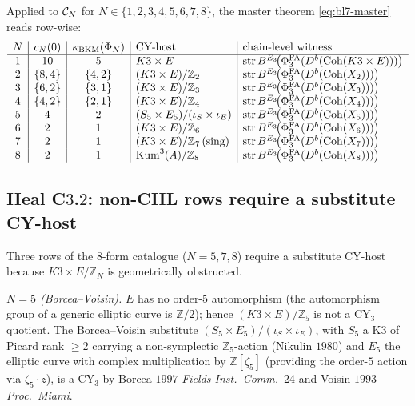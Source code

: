 Applied to $\mathcal{C}_N$ for $N \in \{1, 2, 3, 4, 5, 6, 7, 8\}$, the master
theorem \eqref{eq:bl7-master} reads row-wise:
\[
\begin{array}{c|c|c|l|l}
 N & c_N(0) & \kBKM(\Phi_N) & \text{CY-host} & \text{chain-level witness} \\ \hline
 1 & 10 & 5 & K3 \times E & \mathrm{str}\,\BE{3}\!\bigl(\PhiFAt(D^b(\Coh(K3 \times E)))\bigr) \\
 2 & \{8, 4\} & \{4, 2\} & (K3 \times E) / \mathbb{Z}_2 & \mathrm{str}\,\BE{3}\!\bigl(\PhiFAt(D^b(\Coh(X_2)))\bigr) \\
 3 & \{6, 2\} & \{3, 1\} & (K3 \times E) / \mathbb{Z}_3 & \mathrm{str}\,\BE{3}\!\bigl(\PhiFAt(D^b(\Coh(X_3)))\bigr) \\
 4 & \{4, 2\} & \{2, 1\} & (K3 \times E) / \mathbb{Z}_4 & \mathrm{str}\,\BE{3}\!\bigl(\PhiFAt(D^b(\Coh(X_4)))\bigr) \\
 5 & 4 & 2 & (S_5 \times E_5) / (\iota_S \times \iota_E) & \mathrm{str}\,\BE{3}\!\bigl(\PhiFAt(D^b(\Coh(X_5)))\bigr) \\
 6 & 2 & 1 & (K3 \times E) / \mathbb{Z}_6 & \mathrm{str}\,\BE{3}\!\bigl(\PhiFAt(D^b(\Coh(X_6)))\bigr) \\
 7 & 2 & 1 & (K3 \times E) / \mathbb{Z}_7 \,(\text{sing}) & \mathrm{str}\,\BE{3}\!\bigl(\PhiFAt(D^b(\Coh(X_7)))\bigr) \\
 8 & 2 & 1 & \mathrm{Kum}^3(A) / \mathbb{Z}_8 & \mathrm{str}\,\BE{3}\!\bigl(\PhiFAt(D^b(\Coh(X_8)))\bigr) \\
\end{array}
\]

\subsection*{Heal C$3$.$2$: non-CHL rows require a substitute
CY-host}

Three rows of the 8-form catalogue ($N = 5, 7, 8$) require a substitute
CY-host because $K3 \times E / \mathbb{Z}_N$ is geometrically
obstructed.

\emph{$N = 5$ (Borcea--Voisin).} $E$ has no order-$5$ automorphism
(the automorphism group of a generic elliptic curve is
$\mathbb{Z}/2$); hence $(K3 \times E) / \mathbb{Z}_5$ is not a CY$_3$
quotient. The Borcea--Voisin substitute $(S_5 \times E_5) / (\iota_S
\times \iota_E)$, with $S_5$ a K$3$ of Picard rank $\geq 2$ carrying a
non-symplectic $\mathbb{Z}_5$-action (Nikulin $1980$) and $E_5$ the
elliptic curve with complex multiplication by $\mathbb{Z}[\zeta_5]$
(providing the order-$5$ action via $\zeta_5 \cdot z$), is a CY$_3$ by
Borcea $1997$ \emph{Fields Inst.~Comm.}~24 and Voisin $1993$
\emph{Proc.~Miami}.

